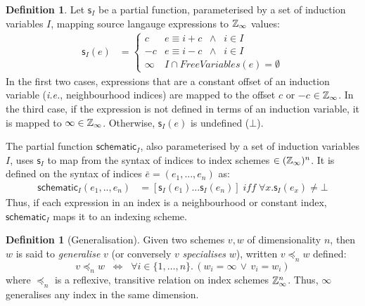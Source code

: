 \documentclass[10pt,preprint,numbers]{sigplanconf}
\newcounter{block}
\theoremstyle{definition}
\newtheorem{definition}[block]{Definition}
\newcommand{\ie}{\emph{i.e.}}
\begin{document}
\newcommand{\schemeOne}{\textsf{s}_I}
\newcommand{\schemeN}{\textsf{schematic}_I}
\begin{definition}%
\label{def:schematic}
Let $\schemeOne$ be a partial function, parameterised by a set of
induction variables $I$, mapping source langauge expressions to
$\mathbb{Z}_\infty$ values:
\begin{align*}
\schemeOne(e)
 & =  \begin{cases}
c & e \equiv i + c \;\; \wedge \;\; i \in I \\
-c & e \equiv i - c \;\; \wedge \;\; i \in I \\
\infty & \textit{$I \cap \textit{FreeVariables}(e) = \emptyset $} %
\end{cases}
\end{align*}
In the
first two cases, expressions that are a constant offset of an
induction variable (\ie{}, neighbourhood indices) are mapped to the
offset $c$ or $-c$ $\in \mathbb{Z}_\infty$. In the third case, if the
expression is not defined in terms of an induction variable, it
is mapped to $\infty \in \mathbb{Z}_\infty{}$. Otherwise, $\schemeOne(e)$
is undefined ($\bot$).

The partial function $\schemeN$, also parameterised by a set of
induction variables $I$, uses $\schemeOne$ to
 map from the syntax of indices to index schemes
$\in (\mathbb{Z}_\infty)^n$. It is defined on the syntax of indices $\bar{e} = (e_1, ..., e_n)$ as:
\begin{align*}
\schemeN(e_1, .., e_n) & =
[\schemeOne(e_1) ... \schemeOne(e_n) ]
\; \textit{iff} \; \forall x . \schemeOne(e_x) \neq \bot
\end{align*}
%
Thus, if each expression in an index is a neighbourhood or constant
index, $\schemeN$ maps it to an indexing scheme.
\end{definition}

\begin{definition}[Generalisation]
\label{def:generalisation}
Given two schemes $v, w$ of dimensionality $n$,
then $w$ is said to \emph{generalise} $v$
(or conversely $v$ \emph{specialises} $w$),
written $v \preceq_n w$ defined:
\[
v \preceq_n w \;\; \Leftrightarrow  \;\;
  \forall i\!\in\!\{ 1, \ldots, n \} . \, (w_i = \infty \, \vee \, v_i = w_i)
\]
where $\preceq_n$ is a reflexive, transitive relation on
index schemes $\mathbb{Z}_\infty^n$. Thus,
 $\infty$ generalises any index in the same dimension.
%
\end{definition}
\end{document}

